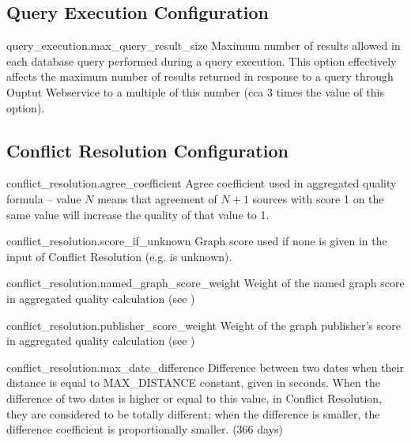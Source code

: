 \subsection*{Query Execution Configuration}	
\begin{configlist}
	\item[query\_execution.max\_query\_result\_size]
		Maximum number of results allowed in each database query performed during a query execution. This option effectively affects the maximum number of results returned in response to a query through Ouptut Webservice to a multiple of this number (cca 3 times the value of this option).
\end{configlist}

\subsection*{Conflict Resolution Configuration}
\begin{configlist}
	\item[conflict\_resolution.agree\_coefficient]
		Agree coefficient used in aggregated quality formula -- value $N$ means that agreement of $N+1$ sources with score 1 on the same value will increase the quality of that value to 1.
	\item[conflict\_resolution.score\_if\_unknown]
			Graph score used if none is given in the input of Conflict Resolution (e.g. is unknown).
	\item[conflict\_resolution.named\_graph\_score\_weight]
			Weight of the named graph score in aggregated quality calculation (see \linebreak {})
	\item[conflict\_resolution.publisher\_score\_weight]
			Weight of the graph publisher's score in aggregated quality calculation (see \linebreak {})
	\item[conflict\_resolution.max\_date\_difference]
			Difference between two dates when their distance is equal to MAX\_DISTANCE constant, given in seconds. When the difference of two dates is higher or equal to this value, in Conflict Resolution, they are considered to be totally different; when the difference is smaller, the difference coefficient is proportionally smaller.
			 (366 days)
\end{configlist}

